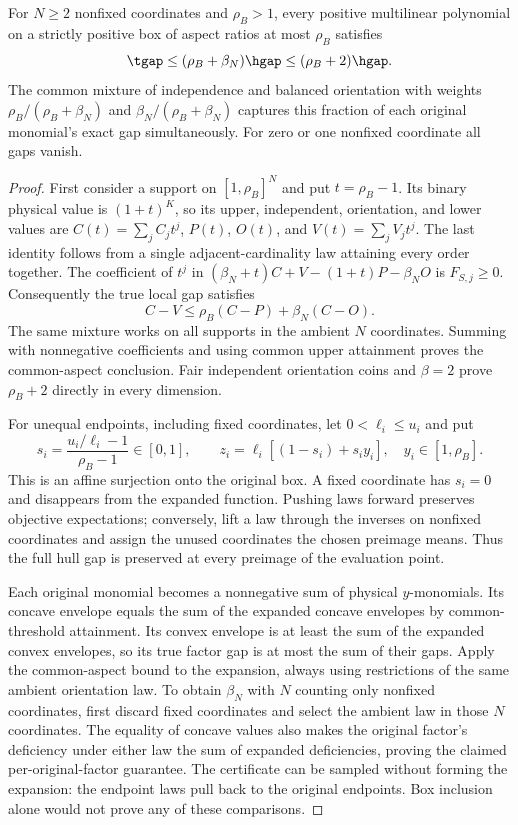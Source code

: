 \begin{theorem}\label{thm:positive-box-upper}
For $N\ge2$ nonfixed coordinates and $\rho_B>1$, every positive
multilinear polynomial on a strictly positive box of aspect ratios at
most $\rho_B$ satisfies
\[
 \tgap\le(\rho_B+\beta_N)\hgap\le(\rho_B+2)\hgap.
\]
The common mixture of independence and balanced orientation with weights
$\rho_B/(\rho_B+\beta_N)$ and $\beta_N/(\rho_B+\beta_N)$ captures this
fraction of each original monomial's exact gap simultaneously. For zero
or one nonfixed coordinate all gaps vanish.
\end{theorem}
\begin{proof}
First consider a support on $[1,\rho_B]^N$ and put $t=\rho_B-1$.
Its binary physical value is $(1+t)^K$, so its upper, independent,
orientation, and lower values are $C(t)=\sum_jC_jt^j$, $P(t)$,
$O(t)$, and $V(t)=\sum_jV_jt^j$. The last identity follows from a
single adjacent-cardinality law attaining every order together.
The coefficient of $t^j$ in
$(\beta_N+t)C+V-(1+t)P-\beta_NO$ is $F_{S,j}\ge0$.
Consequently the true local gap satisfies
\begin{equation}\label{eq:physical-local}
 C-V\le\rho_B(C-P)+\beta_N(C-O).
\end{equation}
The same mixture works on all supports in the ambient $N$ coordinates.
Summing with nonnegative coefficients and using common upper attainment
proves the common-aspect conclusion. Fair independent orientation coins
and $\beta=2$ prove $\rho_B+2$ directly in every dimension.

For unequal endpoints, including fixed coordinates, let $0<\ell_i\le u_i$ and put
\[
 s_i=\frac{u_i/\ell_i-1}{\rho_B-1}\in[0,1],\qquad
 z_i=\ell_i[(1-s_i)+s_i y_i],\quad y_i\in[1,\rho_B].
\]
This is an affine surjection onto the original box. A fixed coordinate
has $s_i=0$ and disappears from the expanded function. Pushing laws
forward preserves objective expectations; conversely, lift a law through
the inverses on nonfixed coordinates and assign the unused coordinates
the chosen preimage means. Thus the full hull gap is preserved at every
preimage of the evaluation point.

Each original monomial becomes a nonnegative sum of physical
$y$-monomials. Its concave envelope equals the sum of the expanded
concave envelopes by common-threshold attainment. Its convex envelope
is at least the sum of the expanded convex envelopes, so its true
factor gap is at most the sum of their gaps.
Apply the common-aspect bound to the expansion, always using restrictions
of the same ambient orientation law. To obtain $\beta_N$ with $N$ counting
only nonfixed coordinates, first discard fixed coordinates and select
the ambient law in those $N$ coordinates. The equality of concave values
also makes the original factor's deficiency under either law the sum of
expanded deficiencies, proving the claimed per-original-factor guarantee.
The certificate can be sampled without forming the expansion: the
endpoint laws pull back to the original endpoints. Box inclusion alone
would not prove any of these comparisons.
\end{proof}

